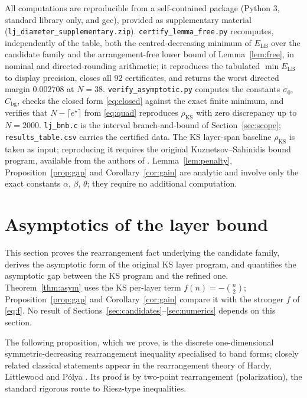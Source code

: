 \documentclass[11pt]{article}
\theoremstyle{remark}
\newcommand{\LB}{\mathrm{LB}}
\newcommand{\bg}{\mathrm{bg}}
\newcommand{\KS}{\mathrm{KS}}
\begin{document}
All computations are reproducible from a self-contained package (Python 3, standard library only, and gcc), provided as supplementary material (\texttt{lj\_diameter\_supplementary.zip}). \texttt{certify\_lemma\_free.py} recomputes, independently of the table, both the centred-decreasing minimum of $E_\LB$ over the candidate family and the arrangement-free lower bound of Lemma~\ref{lem:free}, in nominal and directed-rounding arithmetic; it reproduces the tabulated $\min E_\LB$ to display precision, closes all 92 certificates, and returns the worst directed margin $0.002708$ at $N=38$. \texttt{verify\_asymptotic.py} computes the constants $\sigma_0$, $C_\bg$, checks the closed form \eqref{eq:closed} against the exact finite minimum, and verifies that $N-\lceil e^\star\rceil$ from \eqref{eq:quad} reproduces $\rho_\KS$ with zero discrepancy up to $N=2000$. \texttt{lj\_bnb.c} is the interval branch-and-bound of Section~\ref{sec:scope}; \texttt{results\_table.csv} carries the certified data. The KS layer-span baseline $\rho_\KS$ is taken as input; reproducing it requires the original Kuznetsov--Sahinidis bound program, available from the authors of \cite{ks2025}. Lemma~\ref{lem:penalty}, Proposition~\ref{prop:gap} and Corollary~\ref{cor:gain} are analytic and involve only the exact constants $\alpha$, $\beta$, $\theta$; they require no additional computation.

\section{Asymptotics of the layer bound}\label{sec:asym}

This section proves the rearrangement fact underlying the candidate family, derives the asymptotic form of the original KS layer program, and quantifies the asymptotic gap between the KS program and the refined one. Theorem~\ref{thm:asym} uses the KS per-layer term $f(n)=-\binom n2$; Proposition~\ref{prop:gap} and Corollary~\ref{cor:gain} compare it with the stronger $f$ of \eqref{eq:f}. No result of Sections~\ref{sec:candidates}--\ref{sec:numerics} depends on this section.

The following proposition, which we prove, is the discrete one-dimensional symmetric-decreasing rearrangement inequality specialised to band forms; closely related classical statements appear in the rearrangement theory of Hardy, Littlewood and P\'olya \cite[Ch.\ X]{hlp}. Its proof is by two-point rearrangement (polarization), the standard rigorous route to Riesz-type inequalities.
\end{document}
